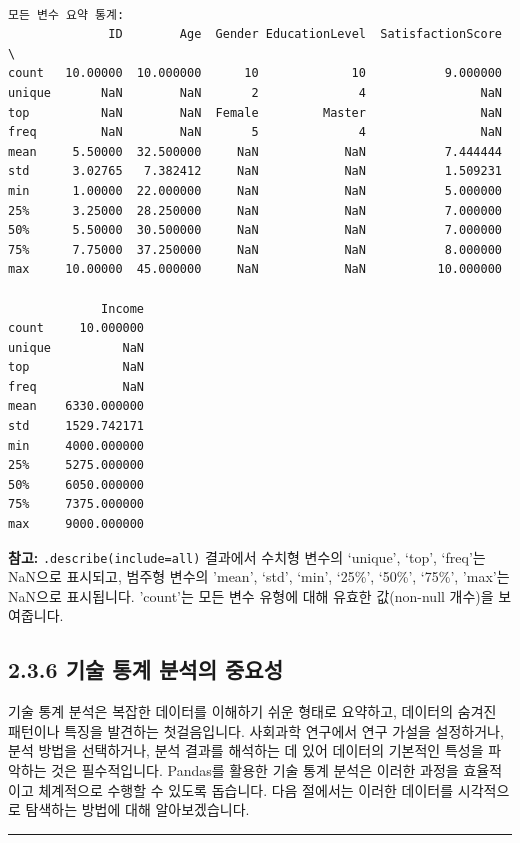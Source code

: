 \documentclass[
  letterpaper,
]{book}
\begin{document}
\begin{verbatim}

모든 변수 요약 통계:
              ID        Age  Gender EducationLevel  SatisfactionScore  \
count   10.00000  10.000000      10             10           9.000000   
unique       NaN        NaN       2              4                NaN   
top          NaN        NaN  Female         Master                NaN   
freq         NaN        NaN       5              4                NaN   
mean     5.50000  32.500000     NaN            NaN           7.444444   
std      3.02765   7.382412     NaN            NaN           1.509231   
min      1.00000  22.000000     NaN            NaN           5.000000   
25%      3.25000  28.250000     NaN            NaN           7.000000   
50%      5.50000  30.500000     NaN            NaN           7.000000   
75%      7.75000  37.250000     NaN            NaN           8.000000   
max     10.00000  45.000000     NaN            NaN          10.000000   

             Income  
count     10.000000  
unique          NaN  
top             NaN  
freq            NaN  
mean    6330.000000  
std     1529.742171  
min     4000.000000  
25%     5275.000000  
50%     6050.000000  
75%     7375.000000  
max     9000.000000  
\end{verbatim}

\textbf{참고:}
\texttt{.describe(include=\textquotesingle{}all\textquotesingle{})}
결과에서 수치형 변수의 `unique', `top', `freq'는 NaN으로 표시되고,
범주형 변수의 'mean', `std', `min', `25\%', `50\%', `75\%', 'max'는
NaN으로 표시됩니다. 'count'는 모든 변수 유형에 대해 유효한 값(non-null
개수)을 보여줍니다.

\subsection{2.3.6 기술 통계 분석의
중요성}\label{uxae30uxc220-uxd1b5uxacc4-uxbd84uxc11duxc758-uxc911uxc694uxc131}

기술 통계 분석은 복잡한 데이터를 이해하기 쉬운 형태로 요약하고, 데이터의
숨겨진 패턴이나 특징을 발견하는 첫걸음입니다. 사회과학 연구에서 연구
가설을 설정하거나, 분석 방법을 선택하거나, 분석 결과를 해석하는 데 있어
데이터의 기본적인 특성을 파악하는 것은 필수적입니다. Pandas를 활용한
기술 통계 분석은 이러한 과정을 효율적이고 체계적으로 수행할 수 있도록
돕습니다. 다음 절에서는 이러한 데이터를 시각적으로 탐색하는 방법에 대해
알아보겠습니다.

\begin{center}\rule{0.5\linewidth}{0.5pt}\end{center}
\end{document}
